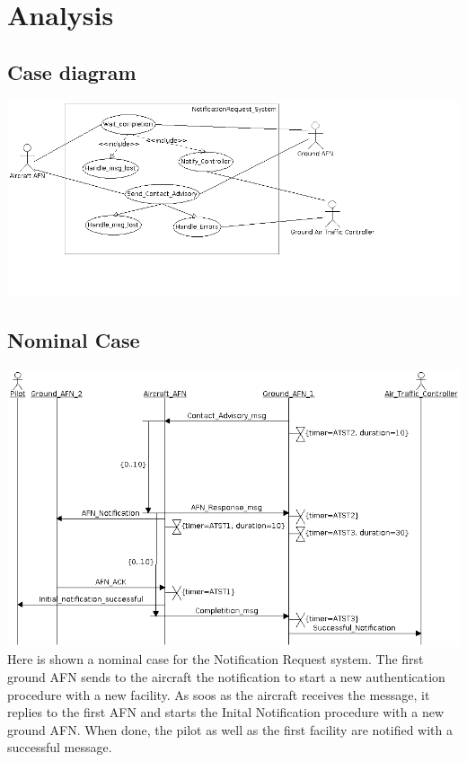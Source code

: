 \documentclass{article}
\begin{document}
\section{Analysis}

\subsection{Case diagram}
\includegraphics[width=\textwidth]{./lab2_11.png}

\subsection{Nominal Case}
\includegraphics[width=\textwidth]{./lab2_12.png}
Here is shown a nominal case for the Notification Request system. 
The first ground AFN sends to the aircraft the notification to start a new authentication 
procedure with a new facility. As soos as the aircraft receives the message, it replies to
the first AFN and starts the Inital Notification procedure with a new ground AFN. When done,
the pilot as well as the first facility are notified with a successful message. 
\end{document}
